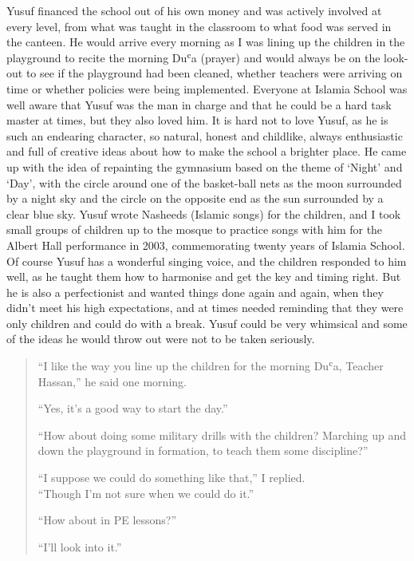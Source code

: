 \documentclass[12pt]{memoir}
\def\`{ʿ} %
\newcommand{\cor}[2]{#2} %
\begin{document}
Yusuf financed the school out of his own money
and was actively involved at every level,
from what was taught in the classroom to what food was served in the canteen.
He would arrive every morning as I was lining up the children
in the playground to recite the morning Du\`a (prayer)
and would always be on the look-out to see if the playground had been cleaned,
whether teachers were arriving on time
or whether policies were being implemented.
Everyone at Islamia School was well aware that Yusuf was the man in charge
and that he could be a hard task master at times, but they also loved him.
It is hard not to love Yusuf, as he is such an endearing character,
so natural, honest and childlike,
always enthusiastic and full of creative ideas
about how to make the school a brighter place.
He came up with the idea of \cor{re-painting}{repainting} the gymnasium
based on the theme of ‘Night’ and ‘Day’,
with the circle around one of the basket-ball nets
as the moon surrounded by a night sky and the circle on the opposite end
as the sun surrounded by a clear blue sky.
Yusuf wrote Nasheeds (Islamic songs) for the children,
and I took small groups of children up to the mosque to practice songs
with him for the Albert Hall performance in 2003,
commemorating twenty years of Islamia School.
Of course Yusuf has a wonderful singing voice,
and the children responded to him well,
as he taught them how to harmonise and get the key and timing right.
But he is also a perfectionist and wanted things done again and again,
when they didn’t meet his high expectations,
and at times needed reminding that they were only children
and could do with a break.
Yusuf could be very whimsical and some of the ideas
he would throw out were not to be taken seriously.

\begin{quote}
“I like the way you line up the children for the morning Du\`a,
Teacher Hassan,” he said one morning.

“Yes, it’s a good way to start the day.”

“How about doing some military drills with the children?
Marching up and down the playground in formation,
to teach them some discipline?”

“I suppose we could do something like that,” I replied.\\
“Though I’m not sure when we could do it.”

“How about in PE lessons?”

“I’ll look into it.”
\end{quote}
\end{document}
